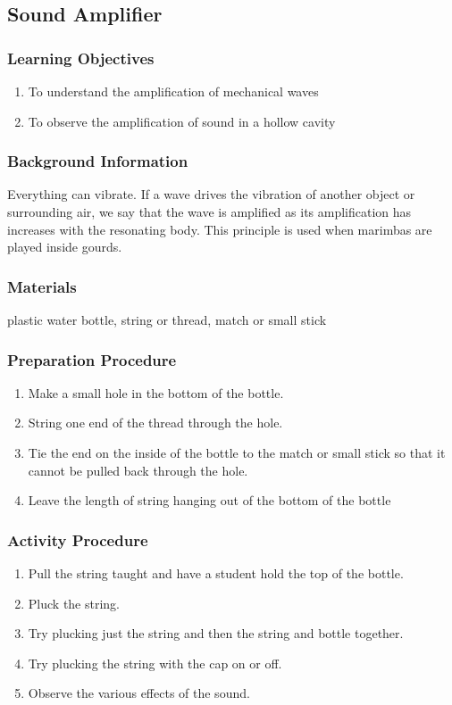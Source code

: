 \subsection{Sound Amplifier}

\subsubsection*{Learning Objectives}
\begin{enumerate}
\item{To understand the amplification of mechanical waves}
\item{To observe the amplification of sound in a hollow cavity}
\end{enumerate}

\subsubsection*{Background Information}
Everything can vibrate.  If a wave drives the vibration of another object or surrounding air, we say that the wave is amplified as its amplification has increases with the resonating body.  This principle is used when marimbas are played inside gourds.

\subsubsection*{Materials}
plastic water bottle, string or thread, match or small stick

\subsubsection*{Preparation Procedure}
\begin{enumerate}
\item{Make a small hole in the bottom of the bottle.}
\item{String one end of the thread through the hole.}
\item{Tie the end on the inside of the bottle to the match or small stick so that it cannot be pulled back through the hole.}
\item{Leave the length of string hanging out of the bottom of the bottle}
\end{enumerate}

\subsubsection*{Activity Procedure}
\begin{enumerate}
\item{Pull the string taught and have a student hold the top of the bottle.}
\item{Pluck the string.}
\item{Try plucking just the string and then the string and bottle together.}
\item{Try plucking the string with the cap on or off.}
\item{Observe the various effects of the sound.}
\end{enumerate}

